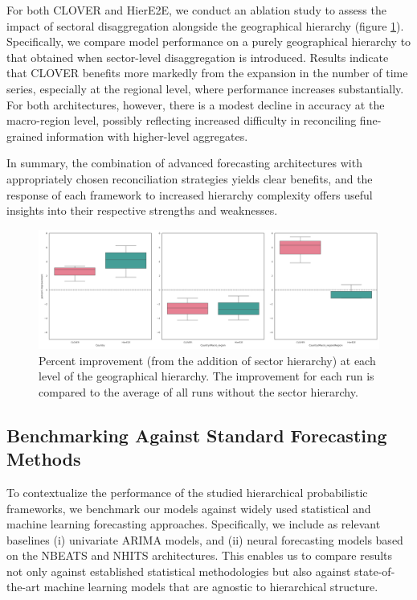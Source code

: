 \documentclass[letterpaper]{article}
\begin{document}
For both CLOVER and HierE2E, we conduct an ablation study to assess the impact of sectoral disaggregation alongside the geographical hierarchy (figure \ref{fig:improvement}). 
Specifically, we compare model performance on a purely geographical hierarchy to that obtained when sector-level disaggregation is introduced. 
Results indicate that CLOVER benefits more markedly from the expansion in the number of time series, especially at the regional level, where performance increases substantially. 
For both architectures, however, there is a modest decline in accuracy at the macro-region level, possibly reflecting increased difficulty in reconciling fine-grained information with higher-level aggregates.

In summary, the combination of advanced forecasting architectures with appropriately chosen reconciliation strategies yields clear benefits, and the response of each framework to increased hierarchy complexity offers useful insights into their respective strengths and weaknesses.

\begin{figure}
    \centering
    \includegraphics[width=\linewidth]{pct_improvement_sector.png}
    \caption{Percent improvement (from the addition of sector hierarchy) at each level of the geographical hierarchy. The improvement for each run is compared to the average of all runs without the sector hierarchy.}
    \label{fig:improvement}
\end{figure}


\subsection{Benchmarking Against Standard Forecasting Methods}

To contextualize the performance of the studied hierarchical probabilistic frameworks, we benchmark our models against widely used statistical and machine learning forecasting approaches. 
Specifically, we include as relevant baselines (i) univariate ARIMA models, and (ii) neural forecasting models based on the NBEATS and NHITS architectures. 
This enables us to compare results not only against established statistical methodologies but also against state-of-the-art machine learning models that are agnostic to hierarchical structure.
\end{document}
